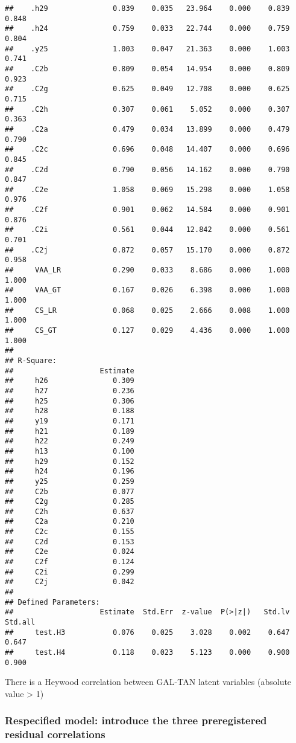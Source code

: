 \documentclass[
]{article}
\begin{document}
\begin{verbatim}
##    .h29               0.839    0.035   23.964    0.000    0.839    0.848
##    .h24               0.759    0.033   22.744    0.000    0.759    0.804
##    .y25               1.003    0.047   21.363    0.000    1.003    0.741
##    .C2b               0.809    0.054   14.954    0.000    0.809    0.923
##    .C2g               0.625    0.049   12.708    0.000    0.625    0.715
##    .C2h               0.307    0.061    5.052    0.000    0.307    0.363
##    .C2a               0.479    0.034   13.899    0.000    0.479    0.790
##    .C2c               0.696    0.048   14.407    0.000    0.696    0.845
##    .C2d               0.790    0.056   14.162    0.000    0.790    0.847
##    .C2e               1.058    0.069   15.298    0.000    1.058    0.976
##    .C2f               0.901    0.062   14.584    0.000    0.901    0.876
##    .C2i               0.561    0.044   12.842    0.000    0.561    0.701
##    .C2j               0.872    0.057   15.170    0.000    0.872    0.958
##     VAA_LR            0.290    0.033    8.686    0.000    1.000    1.000
##     VAA_GT            0.167    0.026    6.398    0.000    1.000    1.000
##     CS_LR             0.068    0.025    2.666    0.008    1.000    1.000
##     CS_GT             0.127    0.029    4.436    0.000    1.000    1.000
## 
## R-Square:
##                    Estimate
##     h26               0.309
##     h27               0.236
##     h25               0.306
##     h28               0.188
##     y19               0.171
##     h21               0.189
##     h22               0.249
##     h13               0.100
##     h29               0.152
##     h24               0.196
##     y25               0.259
##     C2b               0.077
##     C2g               0.285
##     C2h               0.637
##     C2a               0.210
##     C2c               0.155
##     C2d               0.153
##     C2e               0.024
##     C2f               0.124
##     C2i               0.299
##     C2j               0.042
## 
## Defined Parameters:
##                    Estimate  Std.Err  z-value  P(>|z|)   Std.lv  Std.all
##     test.H3           0.076    0.025    3.028    0.002    0.647    0.647
##     test.H4           0.118    0.023    5.123    0.000    0.900    0.900
\end{verbatim}

There is a Heywood correlation between GAL-TAN latent variables
(absolute value \textgreater{} 1)

\newpage

\hypertarget{respecified-model-introduce-the-three-preregistered-residual-correlations-1}{%
\subsubsection{Respecified model: introduce the three preregistered
residual
correlations}\label{respecified-model-introduce-the-three-preregistered-residual-correlations-1}}
\end{document}
